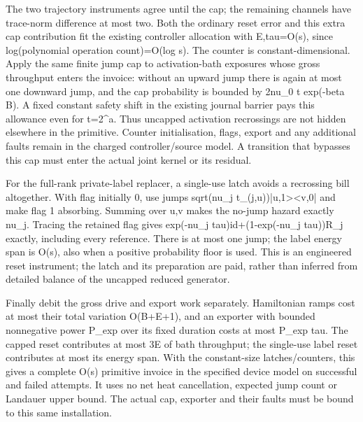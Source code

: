 \documentclass[
]{article}
\begin{document}
The two trajectory instruments agree until the cap; the remaining
channels have trace-norm difference at most two. Both the ordinary reset
error and this extra cap contribution fit the existing controller
allocation with E,tau=O(s), since log(polynomial operation count)=O(log
s). The counter is constant-dimensional. Apply the same finite jump cap
to activation-bath exposures whose gross throughput enters the invoice:
without an upward jump there is again at most one downward jump, and the
cap probability is bounded by 2nu\_0 t exp(-beta B). A fixed constant
safety shift in the existing journal barrier pays this allowance even
for t=2\^{}a. Thus uncapped activation recrossings are not hidden
elsewhere in the primitive. Counter initialisation, flags, export and
any additional faults remain in the charged
c\allowbreak{}o\allowbreak{}n\allowbreak{}t\allowbreak{}r\allowbreak{}o\allowbreak{}l\allowbreak{}l\allowbreak{}e\allowbreak{}r\allowbreak{}/\allowbreak{}s\allowbreak{}o\allowbreak{}u\allowbreak{}r\allowbreak{}c\allowbreak{}e
model. A transition that bypasses this cap must enter the actual joint
kernel or its residual.

For the full-rank private-label replacer, a single-use latch avoids a
recrossing bill altogether. With flag initially 0, use jumps sqrt(nu\_j
t\allowbreak{}\_\allowbreak{}(\allowbreak{}j\allowbreak{},\allowbreak{}u\allowbreak{})\allowbreak{})\allowbreak{}|\allowbreak{}u\allowbreak{},\allowbreak{}1\allowbreak{}>\allowbreak{}<\allowbreak{}v\allowbreak{},\allowbreak{}0\allowbreak{}|
and make flag 1 absorbing. Summing over u,v makes the no-jump hazard
exactly nu\_j. Tracing the retained flag gives exp(-nu\_j
t\allowbreak{}a\allowbreak{}u\allowbreak{})\allowbreak{}i\allowbreak{}d\allowbreak{}+\allowbreak{}(\allowbreak{}1\allowbreak{}-\allowbreak{}e\allowbreak{}x\allowbreak{}p\allowbreak{}(\allowbreak{}-\allowbreak{}n\allowbreak{}u\allowbreak{}\_\allowbreak{}j
tau))R\_j exactly, including every reference. There is at most one jump;
the label energy span is O(s), also when a positive probability floor is
used. This is an engineered reset instrument; the latch and its
preparation are paid, rather than inferred from detailed balance of the
uncapped reduced generator.

Finally debit the gross drive and export work separately. Hamiltonian
ramps cost at most their total variation O(B+E+1), and an exporter with
bounded nonnegative power P\_exp over its fixed duration costs at most
P\_exp tau. The capped reset contributes at most 3E of bath throughput;
the single-use label reset contributes at most its energy span. With the
constant-size
l\allowbreak{}a\allowbreak{}t\allowbreak{}c\allowbreak{}h\allowbreak{}e\allowbreak{}s\allowbreak{}/\allowbreak{}c\allowbreak{}o\allowbreak{}u\allowbreak{}n\allowbreak{}t\allowbreak{}e\allowbreak{}r\allowbreak{}s\allowbreak{},
this gives a complete O(s) primitive invoice in the specified device
model on successful and failed attempts. It uses no net heat
cancellation, expected jump count or Landauer upper bound. The actual
cap, exporter and their faults must be bound to this same installation.
\end{document}
